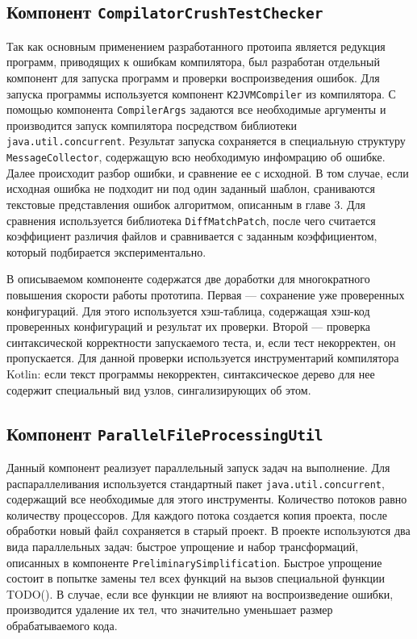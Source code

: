 \subsection{Компонент \texttt{CompilatorCrushTestChecker}}
Так как основным применением разработанного протоипа является редукция программ, приводящих к ошибкам компилятора, был разработан отдельный компонент для запуска программ и проверки воспроизведения ошибок. Для запуска программы используется компонент \texttt{K2JVMCompiler} из компилятора. С помощью компонента \texttt{CompilerArgs} задаются все необходимые аргументы и производится запуск компилятора посредством библиотеки \texttt{java.util.concurrent}. Результат запуска сохраняется в специальную структуру \texttt{MessageCollector}, содержащую всю необходимую инфомрацию об ошибке. Далее происходит разбор ошибки, и сравнение ее с исходной. В том случае, если исходная ошибка не подходит ни под один заданный шаблон, сраниваются текстовые представления ошибок алгоритмом, описанным в главе 3. Для сравнения используется библиотека \texttt{DiffMatchPatch}, после чего считается коэффициент различия файлов и сравнивается с заданным коэффициентом, который подбирается экспериментально. 

В описываемом компоненте содержатся две доработки для многократного повышения скорости работы прототипа. Первая --- сохранение уже проверенных конфигураций. Для этого используется хэш-таблица, содержащая хэш-код проверенных конфигураций и результат их проверки. Второй --- проверка синтаксической корректности запускаемого теста, и, если тест некорректен, он пропускается. Для данной проверки используется инструментарий компилятора Kotlin: если текст программы некорректен, синтаксическое дерево для нее содержит специальный вид узлов, сингализирующих об этом. 

\subsection{Компонент \texttt{ParallelFileProcessingUtil}}
Данный компонент реализует параллельный запуск задач на выполнение. Для распараллеливания используется стандартный пакет \texttt{java.util.concurrent}, содержащий все необходимые для этого инструменты. Количество потоков равно количеству процессоров. Для каждого потока создается копия проекта, после обработки новый файл сохраняется в старый проект. В проекте используются два вида параллельных задач: быстрое упрощение и набор трансформаций, описанных в компоненте \texttt{PreliminarySimplification}. Быстрое упрощение состоит в попытке замены тел всех функций на вызов специальной функции TODO(). В случае, если все функции не влияют на воспроизведение ошибки, производится удаление их тел, что значительно уменьшает размер обрабатываемого кода. 

